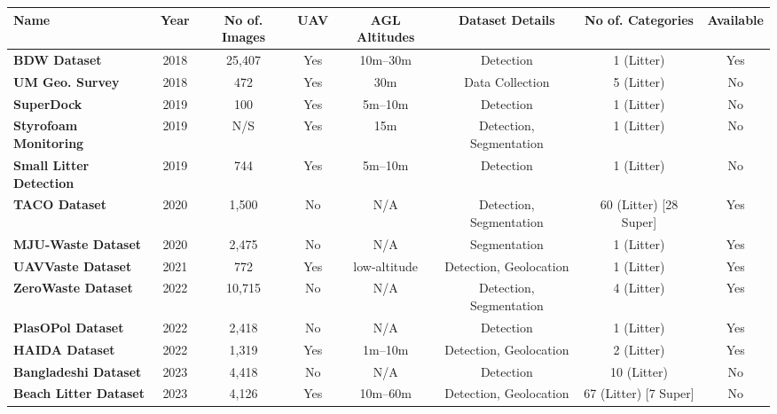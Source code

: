 \begin{table}[htbp]
\centering
\scriptsize
\begin{adjustbox}{max width=\textwidth, center}
\renewcommand{\arraystretch}{2.0}%
\begin{tabular}{|l|c|c|c|c|c|c|c|}%
\hline
\textbf{Name} & \textbf{Year} & \textbf{No of. Images} & \textbf{UAV}& \textbf{AGL Altitudes} & \textbf{Dataset Details}& \textbf{No of. Categories}  & \textbf{Available}\\ 
\hline \hline
\textbf{BDW Dataset \cite{bdwdataset}} & 2018 & 25,407 & Yes & 10m--30m & Detection & 1 (Litter)  &Yes\\ \hline
\textbf{UM Geo. Survey \cite{umgeosurvey}} & 2018 & 472 & Yes & 30m & Data Collection & 5 (Litter)  &No\\\hline
\textbf{SuperDock \cite{superdock}} & 2019 & 100 & Yes & 5m--10m & Detection & 1 (Litter)  &No\\\hline
\textbf{Styrofoam Monitoring \cite{styrofoam}} & 2019 & N/S\footnotemark[1] & Yes & 15m & Detection, Segmentation & 1 (Litter)  &No\\\hline
\textbf{Small Litter Detection \cite{small_litter_detection}} & 2019 & 744 & Yes & 5m--10m & Detection & 1 (Litter)  &No\\\hline
\textbf{TACO Dataset \cite{taco2020}} & 2020 & 1,500 & No & N/A\footnotemark[2] & Detection, Segmentation & 60 (Litter) [28 Super]  &Yes\\\hline
\textbf{MJU-Waste Dataset \cite{mju_waste}} & 2020 & 2,475 & No & N/A\footnotemark[2] & Segmentation & 1 (Litter)  &Yes\\\hline
\textbf{UAVVaste Dataset \cite{uavvaste}} & 2021 & 772 & Yes & low-altitude & Detection, Geolocation & 1 (Litter)  &Yes\\\hline
\textbf{ZeroWaste Dataset \cite{zerowaste}} & 2022 & 10,715 & No & N/A\footnotemark[2] & Detection, Segmentation & 4 (Litter)  &Yes\\\hline
\textbf{PlasOPol Dataset \cite{plastopol}} & 2022 & 2,418 & No & N/A\footnotemark[2] & Detection & 1 (Litter)  &Yes\\\hline
\textbf{HAIDA Dataset \cite{haida}} & 2022 & 1,319 & Yes & 1m--10m & Detection, Geolocation & 2 (Litter)  &Yes\\\hline
\textbf{Bangladeshi Dataset \cite{bangladeshi}} & 2023 & 4,418 & No & N/A\footnotemark[2] & Detection & 10 (Litter)  &No\\\hline
\textbf{Beach Litter Dataset \cite{beach_litter}} & 2023 & 4,126 & Yes & 10m--60m & Detection, Geolocation & 67 (Litter) [7 Super]  &No\\\hline

\end{tabular}
\end{adjustbox}
\end{table}
